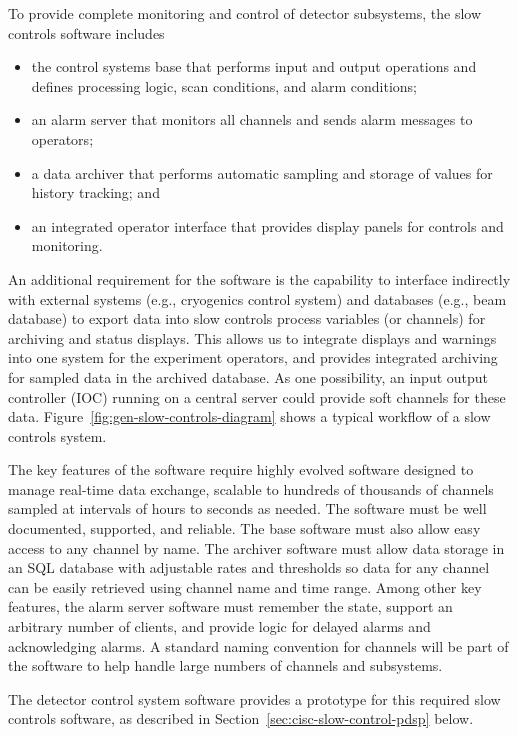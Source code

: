 To provide complete monitoring and control of detector subsystems, the slow controls software includes
%
\begin{itemize}
 \item the control systems base that performs input and output operations
  and defines processing logic, scan conditions, and alarm conditions;
 \item an alarm server that monitors all channels and sends alarm
  messages to operators;
 \item a data archiver that performs automatic sampling and storage of
  values for history tracking; and 
 \item an integrated operator interface that provides display panels for
  controls and monitoring.
\end{itemize}

An additional requirement for the software is the capability to 
interface indirectly with external systems (e.g., cryogenics control
system) and databases (e.g., beam database) to export data into
slow controls process variables (or channels) for archiving and status
displays. This allows us to integrate displays and warnings into one
system for the experiment operators, and %
provides integrated
archiving for sampled data in the archived database. As one possibility, an input output controller (IOC) running on a central 
server could provide soft channels for these data.
Figure~\ref{fig:gen-slow-controls-diagram} shows a typical workflow of a
slow controls system.

The key features of the software require highly evolved software designed to manage real-time data exchange, scalable
to hundreds of thousands of channels sampled at intervals of hours to seconds as needed. The software
must be well documented, supported, and reliable. The base
software must also allow easy access to any channel by name. The
archiver software must allow data storage in an SQL database with
adjustable rates and thresholds so data
for any channel can be easily retrieved using channel name and time range. Among other key
features, the alarm server software must remember the state, support an
arbitrary number of clients, and provide logic for delayed alarms and
acknowledging alarms. A standard naming
convention for channels will be part of the software to help handle large
numbers of channels and subsystems.



The  detector control system software \cite{pdspdcs_proc}
provides a prototype for this required  slow
controls software, as described in Section~\ref{sec:cisc-slow-control-pdsp} below.

